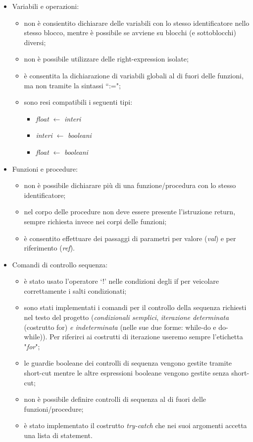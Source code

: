 \documentclass[12pt]{article}
\begin{document}
\begin{itemize}
\item Variabili e operazioni:
	\begin{itemize}
		\item non è consientito dichiarare delle variabili con lo stesso identificatore nello stesso blocco, mentre è possibile se avviene su blocchi (e sottoblocchi) diversi;
		\item non è possibile utilizzare delle right-expression isolate;
		\item è consentita la dichiarazione di variabili globali al di fuori delle funzioni, ma non tramite la sintassi ``:=";
		\item sono resi compatibili i seguenti tipi:
		\begin{itemize}
			\item \textit{float} $\leftarrow$ \textit{interi}
			\item \textit{interi} $\leftarrow$ \textit{booleani}
			\item \textit{float} $\leftarrow$ \textit{booleani}
		\end{itemize}
	\end{itemize}
\item Funzioni e procedure:
	\begin{itemize}
		\item non è possibile dichiarare più di una funzione/procedura con lo stesso identificatore;
		\item nel corpo delle procedure non deve essere presente l'istruzione return, sempre richiesta invece nei corpi delle funzioni;
		\item è consentito effettuare dei passaggi di parametri per valore (\textit{val}) e per riferimento (\textit{ref}).
	\end{itemize}
\item Comandi di controllo sequenza:
	\begin{itemize}
		\item è stato usato l'operatore `!' nelle condizioni degli if per veicolare correttamente i salti condizionati;
		\item sono stati implementati i comandi per il controllo della sequenza richiesti nel testo del progetto (\textit{condizionali semplici}, \textit{iterazione determinata} (costrutto for) \textit{e indeterminata} (nelle sue due forme:  while-do e do-while)). Per riferirci ai costrutti di iterazione useremo sempre l'etichetta "\textit{for}";
		\item le guardie booleane dei controlli di sequenza vengono gestite tramite short-cut mentre le altre espressioni booleane vengono gestite senza short-cut;
		\item non è possibile definire controlli di sequenza al di fuori delle funzioni/procedure;
		\item è stato implementato il costrutto \textit{try-catch} che nei suoi argomenti accetta una lista di statement.
	\end{itemize}
\end{itemize}
\end{document}
